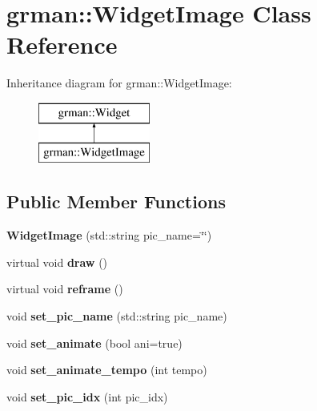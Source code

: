\hypertarget{classgrman_1_1_widget_image}{}\section{grman\+:\+:Widget\+Image Class Reference}
\label{classgrman_1_1_widget_image}
Inheritance diagram for grman\+:\+:Widget\+Image\+:\begin{figure}[H]
\begin{center}
\leavevmode
\includegraphics[height=2.000000cm]{classgrman_1_1_widget_image}
\end{center}
\end{figure}
\subsection*{Public Member Functions}
\begin{DoxyCompactItemize}
\item 
\mbox{\label{classgrman_1_1_widget_image_af9a67025da24eeea3d3ebcea0f492ed1}} 
{\bfseries Widget\+Image} (std\+::string pic\+\_\+name=\char`\"{}\char`\"{})
\item 
\mbox{\label{classgrman_1_1_widget_image_a06e44ca3302524a1ec5c7eacf16ca2b3}} 
virtual void {\bfseries draw} ()
\item 
\mbox{\label{classgrman_1_1_widget_image_af164b59bc1533a8215f438c84f891c2a}} 
virtual void {\bfseries reframe} ()
\item 
\mbox{\label{classgrman_1_1_widget_image_a024e6d7101993d1dbc022f02241e3484}} 
void {\bfseries set\+\_\+pic\+\_\+name} (std\+::string pic\+\_\+name)
\item 
\mbox{\label{classgrman_1_1_widget_image_a0ef99f5a07b9d4d7c843b6c57a409bf8}} 
void {\bfseries set\+\_\+animate} (bool ani=true)
\item 
\mbox{\label{classgrman_1_1_widget_image_ac095ed76d988ba8cc15a1cb5a43be408}} 
void {\bfseries set\+\_\+animate\+\_\+tempo} (int tempo)
\item 
\mbox{\label{classgrman_1_1_widget_image_abaf937bd9edc6e51d4286021d1e302ff}} 
void {\bfseries set\+\_\+pic\+\_\+idx} (int pic\+\_\+idx)
\end{DoxyCompactItemize}
